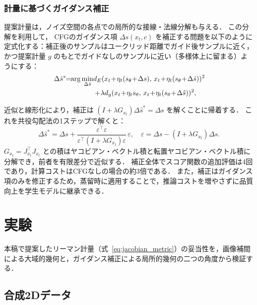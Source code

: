 \documentclass[MIRU,submit]{miru2026j}
\theoremstyle{definition}
\begin{document}
\subsubsection{計量に基づくガイダンス補正}
提案計量は，ノイズ空間の各点での局所的な接線・法線分解も与える．
この分解を利用して，
CFGのガイダンス項 $\Delta s(x_t, c)$ を補正する問題を以下のように定式化する：補正後のサンプルはユークリッド距離でガイド後サンプルに近く，かつ提案計量 $g$ のもとでガイドなしのサンプルに近い（多様体上に留まる）ようにする：
\begin{equation}
    \begin{aligned}
    \Delta\hat{s}^*\!\!=\!\!\arg\min_{\Delta\hat{s}} \space\space&d_E(x_t\!+\!\eta_t(s_\theta\!+\!\Delta s),\,x_t\!+\!\eta_t(s_\theta\!+\!\Delta\hat{s}))^2\!\\
        &+\!\lambda d_g(x_t\!+\!\eta_t s_\theta,\,x_t\!+\!\eta_t(s_\theta\!+\!\Delta\hat{s}))^2,
    \end{aligned}
\end{equation}

近似と線形化により，補正は $(I + \lambda G_{x_t})\Delta\hat{s}^* = \Delta s$ を解くことに帰着する．
これを共役勾配法の1ステップで解くと：
\begin{equation}
    \label{eq:corrected_guidance}
    \textstyle
    \Delta\hat{s}^* = \Delta s + \frac{\varepsilon^\top\varepsilon}{\varepsilon^\top(I+\lambda G_{x_t})\varepsilon}\,\varepsilon, \quad \varepsilon = \Delta s - (I+\lambda G_{x_t})\Delta s.
\end{equation}
$G_{x_t} = J_{x_t}^\top J_{x_t}$ との積はヤコビアン・ベクトル積と転置ヤコビアン・ベクトル積に分解でき，前者を有限差分で近似する．
補正全体でスコア関数の追加評価は4回であり，計算コストはCFGなしの場合の約3倍である．
また，補正はガイダンス項のみを修正するため，蒸留時に適用することで，推論コストを増やさずに品質向上を学生モデルに継承できる．

\section{実験}

本稿で提案したリーマン計量（式~\ref{eq:jacobian_metric}）の妥当性を，画像補間による大域的幾何と，ガイダンス補正による局所的幾何の二つの角度から検証する．

\subsection{合成2Dデータ} %
\label{sec:synthetic}
\end{document}
